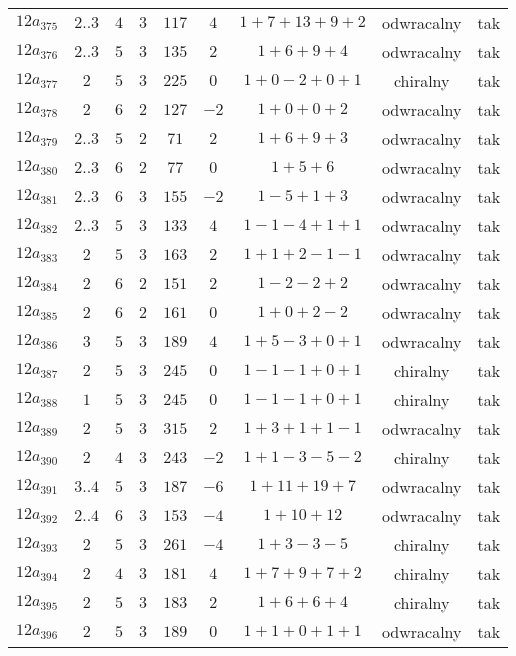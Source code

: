 \begin{longtable}{ccccccccc}
$12a_{375}$ & $2..3$ & $4$ & $3$ & $117$ & $4$ & $1+7+13+9+2$ & odwracalny & tak \\
$12a_{376}$ & $2..3$ & $5$ & $3$ & $135$ & $2$ & $1+6+9+4$ & odwracalny & tak \\
$12a_{377}$ & $2$ & $5$ & $3$ & $225$ & $0$ & $1+0-2+0+1$ & chiralny & tak \\
$12a_{378}$ & $2$ & $6$ & $2$ & $127$ & $-2$ & $1+0+0+2$ & odwracalny & tak \\
$12a_{379}$ & $2..3$ & $5$ & $2$ & $71$ & $2$ & $1+6+9+3$ & odwracalny & tak \\
$12a_{380}$ & $2..3$ & $6$ & $2$ & $77$ & $0$ & $1+5+6$ & odwracalny & tak \\
$12a_{381}$ & $2..3$ & $6$ & $3$ & $155$ & $-2$ & $1-5+1+3$ & odwracalny & tak \\
$12a_{382}$ & $2..3$ & $5$ & $3$ & $133$ & $4$ & $1-1-4+1+1$ & odwracalny & tak \\
$12a_{383}$ & $2$ & $5$ & $3$ & $163$ & $2$ & $1+1+2-1-1$ & odwracalny & tak \\
$12a_{384}$ & $2$ & $6$ & $2$ & $151$ & $2$ & $1-2-2+2$ & odwracalny & tak \\
$12a_{385}$ & $2$ & $6$ & $2$ & $161$ & $0$ & $1+0+2-2$ & odwracalny & tak \\
$12a_{386}$ & $3$ & $5$ & $3$ & $189$ & $4$ & $1+5-3+0+1$ & odwracalny & tak \\
$12a_{387}$ & $2$ & $5$ & $3$ & $245$ & $0$ & $1-1-1+0+1$ & chiralny & tak \\
$12a_{388}$ & $1$ & $5$ & $3$ & $245$ & $0$ & $1-1-1+0+1$ & chiralny & tak \\
$12a_{389}$ & $2$ & $5$ & $3$ & $315$ & $2$ & $1+3+1+1-1$ & odwracalny & tak \\
$12a_{390}$ & $2$ & $4$ & $3$ & $243$ & $-2$ & $1+1-3-5-2$ & chiralny & tak \\
$12a_{391}$ & $3..4$ & $5$ & $3$ & $187$ & $-6$ & $1+11+19+7$ & odwracalny & tak \\
$12a_{392}$ & $2..4$ & $6$ & $3$ & $153$ & $-4$ & $1+10+12$ & odwracalny & tak \\
$12a_{393}$ & $2$ & $5$ & $3$ & $261$ & $-4$ & $1+3-3-5$ & chiralny & tak \\
$12a_{394}$ & $2$ & $4$ & $3$ & $181$ & $4$ & $1+7+9+7+2$ & chiralny & tak \\
$12a_{395}$ & $2$ & $5$ & $3$ & $183$ & $2$ & $1+6+6+4$ & chiralny & tak \\
$12a_{396}$ & $2$ & $5$ & $3$ & $189$ & $0$ & $1+1+0+1+1$ & odwracalny & tak \\

\end{longtable}
